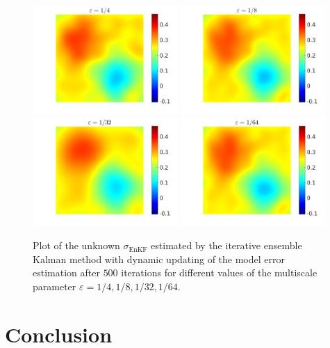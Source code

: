 \documentclass[10pt]{article}
\begin{document}
\begin{figure}[t]
\centering
\includegraphics[width = 0.49\textwidth]{figures/ensemble_500_e4_model_error_Levels}
\includegraphics[width = 0.49\textwidth]{figures/ensemble_500_e8_model_error_Levels}
\\
\includegraphics[width = 0.49\textwidth]{figures/ensemble_500_e32_model_error_Levels}
\includegraphics[width = 0.49\textwidth]{figures/ensemble_500_e64_model_error_Levels}
\caption{Plot of the unknown $\sigma_{\mathrm{EnKF}}$ estimated by the iterative ensemble Kalman method with dynamic updating of the model error estimation after $500$ iterations for different values of the multiscale parameter $\varepsilon = 1/4, 1/8, 1/32, 1/64$.}
\label{fig:comparison_e_model_error_levels}
\end{figure}

\section*{Conclusion}



\clearpage





\end{document}
